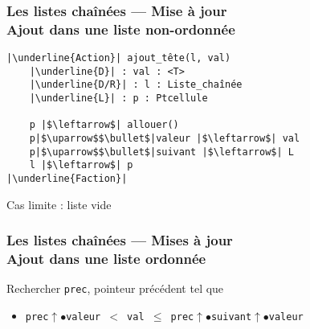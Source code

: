 \documentclass[table,handout,tikz,12pt,svgnames]{beamer}
\begin{document}
\begin{frame}[fragile=singleslide]
	\frametitle{Les listes chaînées --- Mise à jour \\\normalsize Ajout dans une liste non-ordonnée}
	\vspace{-0.7cm}
	\begin{block}{} %
		\begin{verbatim}
|\underline{Action}| ajout_tête(l, val)
	|\underline{D}| : val : <T>
	|\underline{D/R}| : l : Liste_chaînée
	|\underline{L}| : p : Ptcellule
	
	p |$\leftarrow$| allouer()
	p|$\uparrow$$\bullet$|valeur |$\leftarrow$| val
	p|$\uparrow$$\bullet$|suivant |$\leftarrow$| L
	l |$\leftarrow$| p
|\underline{Faction}|
		\end{verbatim}
	\end{block}
	\begin{block}{Cas limite : liste vide}\end{block}	
\end{frame}

\begin{frame}[fragile=singleslide]
	\frametitle{Les listes chaînées --- Mises à jour \\\normalsize Ajout dans une liste ordonnée}
	\vspace{5cm}
	\begin{block}{Rechercher \texttt{prec}, pointeur précédent tel que}
		\begin{itemize}
				\item \texttt{prec$\uparrow$$\bullet$valeur $<$ val $\leq$ prec$\uparrow$$\bullet$suivant$\uparrow$$\bullet$valeur}
		\end{itemize}
	\end{block}
\end{frame}
\end{document}
